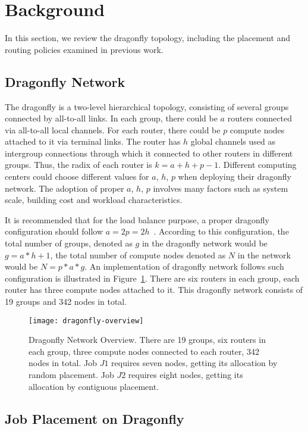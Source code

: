 
\section{Background}
\label{sec:background}

In this section, we review the dragonfly topology, including the placement and routing policies examined in previous work. 

\subsection{Dragonfly Network}
\label{sec:network}
The dragonfly is a two-level hierarchical topology, consisting of several groups connected by all-to-all links. In each group, there could be $a$ routers connected via all-to-all local channels. For each router, there could be $p$ compute nodes attached to it via terminal links. The router has $h$ global channels used as intergroup connections through which it connected to other routers in different groups. Thus, the radix of each router is $k = a+h+p-1$. Different computing centers could choose different values for  $a$, $h$, $p$ when deploying their dragonfly network. The adoption of proper $a$, $h$, $p$ involves many factors such as system scale, building cost and workload characteristics. 

It is recommended that for the load balance purpose, a proper dragonfly configuration should follow $a=2p=2h$~\cite{kim-micro}. According to this configuration, the total number of groups, denoted as $g$ in the dragonfly network would be $g = a*h+1 $, the total number of compute nodes denoted as $N$ in the network would be $N = p*a*g $. An implementation of dragonfly network follows such configuration is illustrated in Figure~\ref{fig:dragonfly-overview}. There are six routers in each group, each router has three compute nodes attached to it. This dragonfly network consists of 19 groups and 342 nodes in total.

\begin{figure}[h!] 
  \centering
  \texttt{[image: dragonfly-overview]}
  \caption{Dragonfly Network Overview. There are 19 groups, six routers in each group, three compute nodes connected to each router, 342 nodes in total. Job $J1$ requires seven nodes, getting its allocation by random placement. Job $J2$ requires eight nodes, getting its allocation by contiguous placement.}
  \label{fig:dragonfly-overview}
\end{figure}


\subsection{Job Placement on Dragonfly}
\label{sec:placement-schemes}

